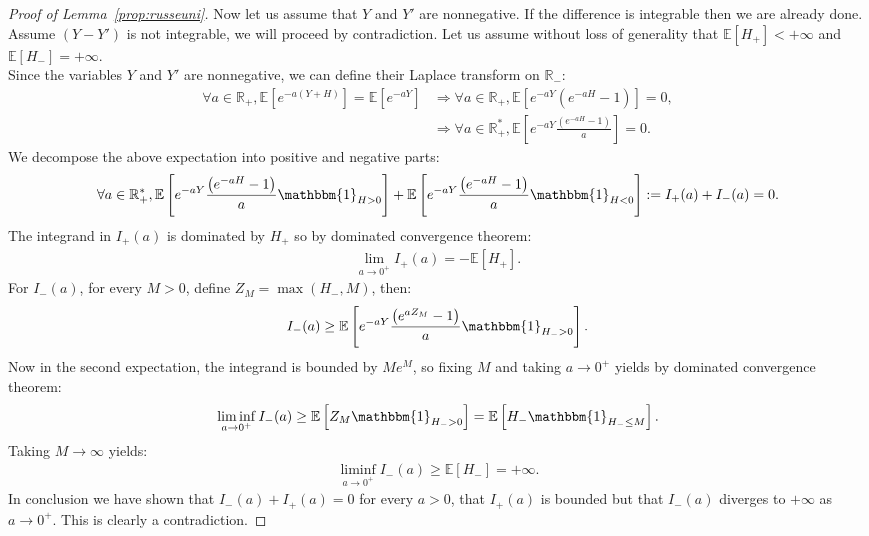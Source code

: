 \documentclass[11pt]{article}
\begin{document}
\begin{proof}[Proof of Lemma~\ref{prop:russeuni}]
Now let us assume that $Y$ and $Y'$ are nonnegative. If the difference is integrable then we are already done. Assume $(Y-Y')$ is not integrable, we will proceed by contradiction.
Let us assume without loss of generality that $\mathbb{E}\left[ H_{+}\right]<+\infty$ and $\mathbb{E}\left[ H_{-}\right]=+\infty$. \\
Since the variables $Y$ and $Y'$ are nonnegative, we can define their Laplace transform on $\mathbb{R}_-$:
    \begin{align*}
        \forall a \in \mathbb{R}_+, \mathbb{E}\left[ e^{-a(Y+H)}\right]=\mathbb{E}\left[ e^{-aY}\right] 
        &\Rightarrow \forall a \in \mathbb{R}_+, \mathbb{E}\left[ e^{-aY} \left(e^{-aH}-1\right) \right]=0, \\
        &\Rightarrow \forall a \in \mathbb{R}_+^{*}, \mathbb{E}\left[ e^{-aY} \frac{\left(e^{-aH}-1\right)}{a} \right]=0.
    \end{align*}
We decompose the above expectation into positive and negative parts:
\begin{align*}
    \forall a \in \mathbb{R}_+^{*}, \mathbb{E}\left[ e^{-aY} \frac{\left(e^{-aH}-1\right)}{a} \mathbbm{1}_{H>0} \right]+\mathbb{E}\left[ e^{-aY} \frac{\left(e^{-aH}-1\right)}{a} \mathbbm{1}_{H<0} \right]:=I_+(a)+I_-(a)=0.
\end{align*}
The integrand in $I_+(a)$ is dominated by $H_+$ so by dominated convergence theorem:
\begin{align*}
    \lim_{a \rightarrow 0^+} I_+(a)= -\mathbb{E}[H_+].
\end{align*}
For $I_-(a)$, for every $M>0$, define $Z_M= \max(H_-,M)$, then:
\begin{align*}
    I_-(a) \geq \mathbb{E}\left[ e^{-aY} \frac{\left(e^{a Z_M}-1\right)}{a} \mathbbm{1}_{H_->0} \right].
\end{align*}
Now in the second expectation, the integrand is bounded by $Me^M$, so fixing $M$ and taking $a \rightarrow 0^+$ yields by dominated convergence theorem:
\begin{align*}
    \liminf_{a \rightarrow 0^+} I_-(a) \geq \mathbb{E}\left[ Z_M \mathbbm{1}_{H_->0} \right]= \mathbb{E}\left[H_- \mathbbm{1}_{H_-\leq M} \right]. 
\end{align*}
Taking $M \rightarrow \infty$ yields:
\begin{align*}
    \liminf_{a \rightarrow 0^+} I_-(a) \geq \mathbb{E}\left[ H_-\right]= +\infty.
\end{align*}
In conclusion we have shown that $I_-(a)+I_+(a)=0$ for every $a>0$, that $I_+(a)$ is bounded but that $I_-(a)$ diverges to $+\infty$ as $a \rightarrow 0^+$. This is clearly a contradiction.



\end{proof}
\end{document}
